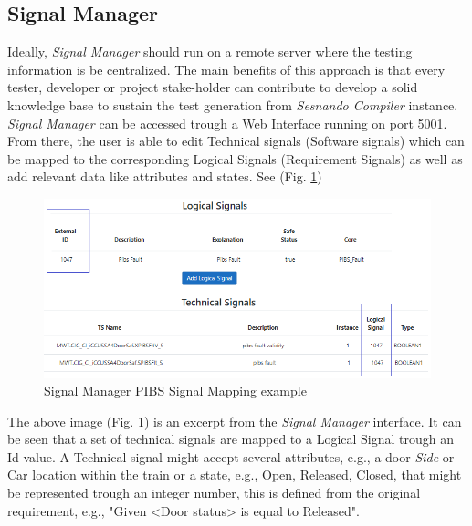 \subsection{Signal Manager}
\label{subsec:signal_manager}

Ideally, \textit{Signal Manager} should run on a remote server where the testing information is be centralized. The main benefits of this approach is that every tester, developer or project stake-holder can contribute to develop a solid knowledge base to sustain the test generation from \textit{Sesnando Compiler} instance.\\

\textit{Signal Manager} can be accessed trough a Web Interface running on port 5001. From there, the user is able to edit Technical signals (Software signals) which can be mapped to the corresponding Logical Signals (Requirement Signals) as well as add relevant data like attributes and states. See (Fig. \ref{fig:signal_manager_pibs})

\begin{figure}[H]
    \centering
    \includegraphics[width=\textwidth]{images/signal_manager_signals_pibs.PNG}
    \caption{Signal Manager PIBS Signal Mapping example}
    \label{fig:signal_manager_pibs}
\end{figure}

The above image (Fig. \ref{fig:signal_manager_pibs}) is an excerpt from the \textit{Signal Manager} interface. It can be seen that a set of technical signals are mapped to a Logical Signal trough an Id value. A Technical signal might accept several attributes, e.g., a door \textit{Side} or Car location within the train or a state, e.g., Open, Released, Closed, that might be represented trough an integer number, this is defined from the original requirement, e.g., "Given <Door status> is equal to Released".


